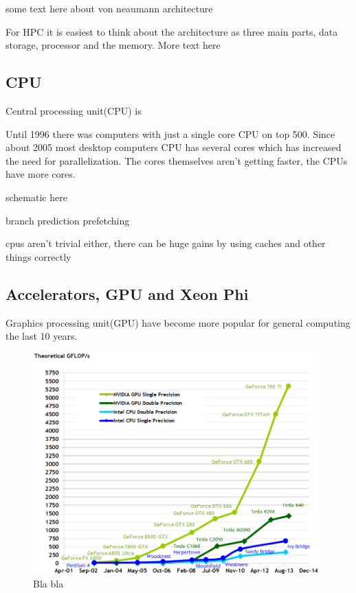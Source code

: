 \documentclass[10pt,a4paper]{report}
\begin{document}
some text here about von neaumann architecture

For HPC it is easiest to think about the architecture as three main parts, data storage, processor and the memory. More text here\cite{intro_hpc}

\subsection{CPU}
Central processing unit(CPU) is \cite{introduction_hpc_hager}

Until 1996 there was computers with just a single core CPU on top 500\cite{TOP500}. Since about 2005 most desktop computers CPU has several cores which has increased the need for parallelization. The cores themselves aren't getting faster, the CPUs have more cores.

schematic here

branch prediction
prefetching

cpus aren't trivial either, there can be huge gains by using caches and other things correctly\cite{drepper2007cpumemory}

\subsection{Accelerators, GPU and Xeon Phi}
Graphics processing unit(GPU) have become more popular for general computing the last 10 years.

\begin{figure}[h]
    \centering
    \includegraphics[width=11cm]{floating-point-operations-per-second.png}
    \caption{Bla bla \cite{cuda}}
    \label{fig:gpu_vs_cpu}
\end{figure}
\end{document}
